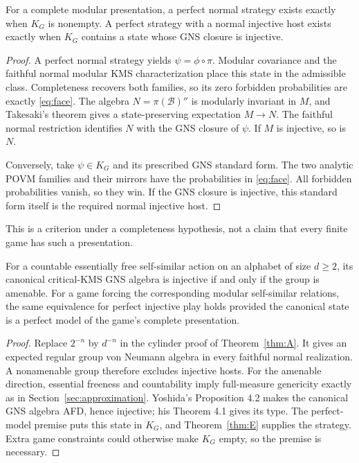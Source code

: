 \begin{theorem}\label{thm:E}
For a complete modular presentation, a perfect normal strategy exists exactly when $K_G$ is nonempty. A perfect strategy with a normal injective host exists exactly when $K_G$ contains a state whose GNS closure is injective.
\end{theorem}
\begin{proof}
A perfect normal strategy yields $\psi=\phi\circ\pi$. Modular covariance and the faithful normal modular KMS characterization \cite[Theorem 2.14]{Hiai} place this state in the admissible class. Completeness recovers both families, so its zero forbidden probabilities are exactly \eqref{eq:face}. The algebra $N=\pi(\mathcal B)''$ is modularly invariant in $M$, and Takesaki's theorem gives a state-preserving expectation $M\to N$. The faithful normal restriction identifies $N$ with the GNS closure of $\psi$. If $M$ is injective, so is $N$.

Conversely, take $\psi\in K_G$ and its prescribed GNS standard form. The two analytic POVM families and their mirrors have the probabilities in \eqref{eq:face}. All forbidden probabilities vanish, so they win. If the GNS closure is injective, this standard form itself is the required normal injective host.
\end{proof}
This is a criterion under a completeness hypothesis, not a claim that every finite game has such a presentation.

\begin{proposition}\label{prop:amenable}
For a countable essentially free self-similar action on an alphabet of size $d\ge2$, its canonical critical-KMS GNS algebra is injective if and only if the group is amenable. For a game forcing the corresponding modular self-similar relations, the same equivalence for perfect injective play holds provided the canonical state is a perfect model of the game's complete presentation.
\end{proposition}
\begin{proof}
Replace $2^{-n}$ by $d^{-n}$ in the cylinder proof of Theorem~\ref{thm:A}. It gives an expected regular group von Neumann algebra in every faithful normal realization. A nonamenable group therefore excludes injective hosts. For the amenable direction, essential freeness and countability imply full-measure genericity exactly as in Section~\ref{sec:approximation}. Yoshida's Proposition 4.2 \cite{Yoshida} makes the canonical GNS algebra AFD, hence injective; his Theorem 4.1 gives its type. The perfect-model premise puts this state in $K_G$, and Theorem~\ref{thm:E} supplies the strategy. Extra game constraints could otherwise make $K_G$ empty, so the premise is necessary.
\end{proof}

